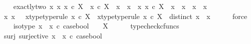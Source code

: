 \begin{isabellebody}
\isamarkupfalse%
\isanewline
\ \ \isamarkupfalse%
\ exactly{\isacharunderscore}{\kern0pt}two{\isacharcolon}{\kern0pt}\ {\isachardoublequoteopen}{\isasymexists}x{}\ x{}{\isachardot}{\kern0pt}\ x{}\ {\isasymin}\isactrlsub c\ X\ {\isasymand}\ x{}\ {\isasymin}\isactrlsub c\ X\ {\isasymand}\ x{}\ {\isasymnoteq}\ x{}\ {\isasymand}\ {\isacharparenleft}{\kern0pt}{\isasymforall}x{\isachardot}{\kern0pt}\ x\ {\isasymin}\isactrlsub c\ X\ {\isasymlongrightarrow}\ x\ {\isacharequal}{\kern0pt}\ x{}\ {\isasymor}\ x\ {\isacharequal}{\kern0pt}\ x{}{\isacharparenright}{\kern0pt}{\isachardoublequoteclose}\isanewline
\ \ \isamarkupfalse%
\ \isamarkupfalse%
\ x{}\ x{}\ \ \ x{}{\isacharunderscore}{\kern0pt}type{\isacharbrackleft}{\kern0pt}type{\isacharunderscore}{\kern0pt}rule{\isacharbrackright}{\kern0pt}{\isacharcolon}{\kern0pt}\ {\isachardoublequoteopen}x{}\ {\isasymin}\isactrlsub c\ X{\isachardoublequoteclose}\ \ x{}{\isacharunderscore}{\kern0pt}type{\isacharbrackleft}{\kern0pt}type{\isacharunderscore}{\kern0pt}rule{\isacharbrackright}{\kern0pt}{\isacharcolon}{\kern0pt}\ {\isachardoublequoteopen}x{}\ {\isasymin}\isactrlsub c\ X{\isachardoublequoteclose}\ \ distinct{\isacharcolon}{\kern0pt}\ {\isachardoublequoteopen}x{}\ {\isasymnoteq}\ x{}{\isachardoublequoteclose}\isanewline
\ \ \ \ \isamarkupfalse%
\ force\isanewline
\ \ \isamarkupfalse%
\ iso{\isacharunderscore}{\kern0pt}type{\isacharcolon}{\kern0pt}\ {\isachardoublequoteopen}{\isacharparenleft}{\kern0pt}{\isacharparenleft}{\kern0pt}x{}\ {\isasymamalg}\ x{}{\isacharparenright}{\kern0pt}\ {\isasymcirc}\isactrlsub c\ case{\isacharunderscore}{\kern0pt}bool{\isacharparenright}{\kern0pt}\ {\isacharcolon}{\kern0pt}\ {\isasymOmega}\ {\isasymrightarrow}\ X{\isachardoublequoteclose}\isanewline
\ \ \ \ \isamarkupfalse%
\ typecheck{\isacharunderscore}{\kern0pt}cfuncs\isanewline
\ \ \isamarkupfalse%
\ surj{\isacharcolon}{\kern0pt}\ {\isachardoublequoteopen}surjective\ {\isacharparenleft}{\kern0pt}{\isacharparenleft}{\kern0pt}x{}\ {\isasymamalg}\ x{}{\isacharparenright}{\kern0pt}\ {\isasymcirc}\isactrlsub c\ case{\isacharunderscore}{\kern0pt}bool{\isacharparenright}{\kern0pt}{\isachardoublequoteclose}\isanewline
\ \ \ \ \isamarkupfalse%

\end{isabellebody}
